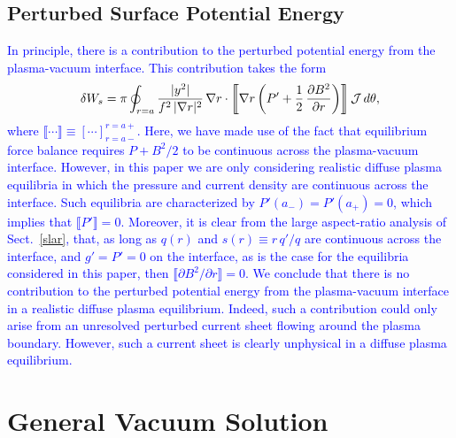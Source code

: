 \documentclass[12pt,prb,aps]{revtex4-1}
\begin{document}
\subsection{Perturbed Surface Potential Energy}
\textcolor{blue}{In principle, there is a contribution to the perturbed potential energy from the plasma-vacuum interface. This
contribution takes the form\,\cite{gs1,rwm5}
\begin{equation}
\delta W_s= \pi\oint_{r=a} \frac{|y^2|}{f^2\,|\nabla r|^2}\,\nabla r\cdot\left\llbracket \nabla r\left(P' + \frac{1}{2}\,\frac{\partial B^2}{\partial r}\right)\right\rrbracket
{\cal J}\,d\theta,
\end{equation}
where $\llbracket\cdots\rrbracket\equiv [\cdots]_{r=a-}^{r=a+}$. Here, we have made use of the fact that equilibrium force balance
 requires $P+B^2/2$ to be continuous across the plasma-vacuum interface.\cite{gs1} However,  in this paper we are only considering realistic diffuse
 plasma equilibria in which the pressure and current density are continuous across the interface. 
 Such equilibria are characterized  by $P'(a_-)=P'(a_+)=0$, which implies that $\llbracket P'\rrbracket = 0$. 
  Moreover, it is clear from the large aspect-ratio analysis
 of Sect.~\ref{slar}, that, as long as $q(r)$ and $s(r)\equiv r\,q'/q$ are continuous across the interface, and $g'=P'=0$ on the interface, 
 as is the case for the equilibria considered in this paper, then
 $\llbracket\partial B^2/\partial r\rrbracket = 0$.\cite{eql} We conclude that there is no contribution to the perturbed potential energy from the
 plasma-vacuum interface in a realistic diffuse plasma equilibrium. Indeed, such a contribution could only arise from an unresolved 
 perturbed current sheet flowing around the plasma boundary. However, such a current sheet is clearly unphysical in a diffuse plasma equilibrium.} 

\section{General Vacuum Solution}\label{vacuum}
\end{document}
